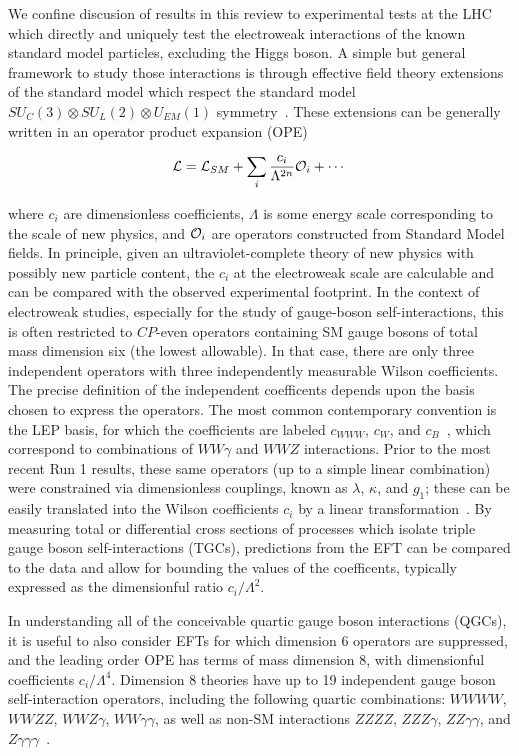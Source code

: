 
We confine discusion of results in this review to experimental tests
at the LHC which directly and uniquely test the electroweak
interactions of the known standard model particles, excluding the
Higgs boson. A simple but general framework to study those
interactions is through effective field theory extensions of the
standard model which respect the standard model $SU_C(3) \otimes
SU_L(2) \otimes U_{EM}(1)$
symmetry~\cite{Weinberg:1978kz,Weinberg:1980wa,Georgi:1994qn}.  These
extensions can be generally written in an operator product expansion
(OPE)

$$ \mathcal{L} = \mathcal{L}_{SM} + \sum_i \frac{c_i}{\Lambda^{2n}}{\cal O}_i + \cdots$$

where $c_i$ are dimensionless coefficients, $\Lambda$ is some energy
scale corresponding to the scale of new physics, and ${\cal O}_i$ are
operators constructed from Standard Model fields.  In principle, given
an ultraviolet-complete theory of new physics with possibly new
particle content, the $c_i$ at the electroweak scale are calculable
and can be compared with the observed experimental footprint. In the
context of electroweak studies, especially for the study of
gauge-boson self-interactions, this is often restricted to $CP$-even
operators containing SM gauge bosons of total mass dimension six (the
lowest allowable).  In that case, there are only three independent
operators with three independently measurable Wilson coefficients. The
precise definition of the independent coefficents depends upon the
basis chosen to express the operators.  The most common contemporary
convention is the LEP basis, for which the coefficients are labeled
$c_{WWW}$, $c_W$, and $c_B$~\cite{Hagiwara:1993ck,Degrande:2012wf},
which correspond to combinations of $WW\gamma$ and $WWZ$ interactions.
Prior to the most recent Run 1 results, these same operators (up to a
simple linear combination) were constrained via dimensionless
couplings, known as $\lambda$, $\kappa$, and $g_1$; these can be
easily translated into the Wilson coefficients $c_i$ by a linear
transformation~\cite{Degrande:2012wf}.  By measuring total or
differential cross sections of processes which isolate triple gauge
boson self-interactions (TGCs), predictions from the EFT can be
compared to the data and allow for bounding the values of the
coefficents, typically expressed as the dimensionful ratio
$c_i/\Lambda^2$.

In understanding all of the conceivable quartic gauge boson
interactions (QGCs), it is useful to also consider EFTs for which
dimension 6 operators are suppressed, and the leading order OPE has
terms of mass dimension 8, with dimensionful coefficients
$c_i/\Lambda^4$.  Dimension 8 theories have up to 19 independent gauge
boson self-interaction operators, including the following quartic
combinations: $WWWW$, $WWZZ$, $WWZ\gamma$, $WW\gamma\gamma$, as well
as non-SM interactions $ZZZZ$, $ZZZ\gamma$, $ZZ\gamma\gamma$, and
$Z\gamma\gamma\gamma$~\cite{Eboli:2006wa,Degrande:2013kka}.

